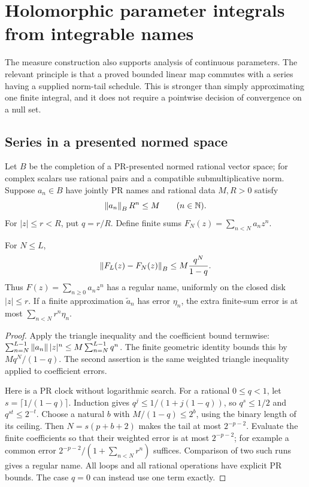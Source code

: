 \section{Holomorphic parameter integrals from integrable names}\label{sec:complex-integrals}

The measure construction also supports analysis of continuous parameters.
The relevant principle is that a proved bounded linear map commutes with a
series having a supplied norm-tail schedule. This is stronger than simply
approximating one finite integral, and it does not require a pointwise
decision of convergence on a null set.

\subsection{Series in a presented normed space}

Let $B$ be the completion of a PR-presented normed rational vector space;
for complex scalars use rational pairs and a compatible submultiplicative
norm. Suppose $a_n\in B$ have jointly PR names and rational data $M,R>0$
satisfy
\begin{equation}\label{eq:coefficient-majorant}
 \left\lVert a_n\right\rVert_B R^n\le M\qquad(n\in\mathbb N).
\end{equation}
For $|z|\le r<R$, put $q=r/R$. Define finite sums
$F_N(z)=\sum_{n<N}a_nz^n$.

\begin{lemma}\label{lem:banach-series}
For $N\le L$,
\begin{equation}\label{eq:banach-tail}
 \left\lVert F_L(z)-F_N(z)\right\rVert_B
 \le M\frac{q^N}{1-q}.
\end{equation}
Thus $F(z)=\sum_{n\ge0}a_nz^n$ has a regular name, uniformly on the
closed disk $|z|\le r$. If a finite approximation $\widetilde a_n$ has
error $\eta_n$, the extra finite-sum error is at most
$\sum_{n<N}r^n\eta_n$.
\end{lemma}
\begin{proof}
Apply the triangle inequality and the coefficient bound termwise:
$\sum_{n=N}^{L-1}\left\lVert a_n\right\rVert|z|^n\le M\sum_{n=N}^{L-1}q^n$.
The finite geometric identity bounds this by
$Mq^N/(1-q)$. The second assertion is the same weighted triangle
inequality applied to coefficient errors.

Here is a PR clock without logarithmic search. For a rational $0\le q<1$,
let $s=\lceil1/(1-q)\rceil$. Induction gives
$q^j\le1/(1+j(1-q))$, so $q^s\le1/2$ and $q^{st}\le2^{-t}$.
Choose a natural $b$ with $M/(1-q)\le2^b$, using the binary length of
its ceiling. Then $N=s(p+b+2)$ makes the tail at most $2^{-p-2}$.
Evaluate the finite coefficients so that their weighted error is at most
$2^{-p-2}$; for example a common error
$2^{-p-2}/(1+\sum_{n<N}r^n)$ suffices. Comparison of two such runs
gives a regular name. All loops and all rational operations have explicit
PR bounds. The case $q=0$ can instead use one term exactly.
\end{proof}


